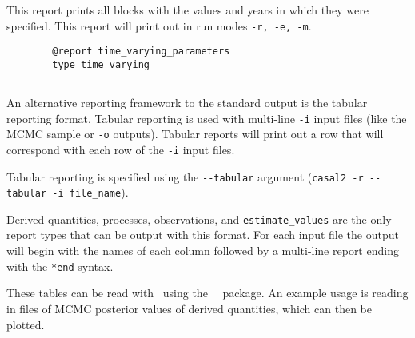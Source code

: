 This report prints all  blocks with the values and years in which they were specified. This report will print out in run modes \texttt{-r, -e, -m}.

{\small{\begin{verbatim}
		@report time_varying_parameters
		type time_varying
		\end{verbatim}}}

\subsection{}\label{sec:Tabular}

An alternative reporting framework to the standard output is the tabular reporting format. Tabular reporting is used with multi-line \texttt{-i} input files (like the MCMC sample or \texttt{-o} outputs). Tabular reports will print out a row that will correspond with each row of the \texttt{-i} input files.

Tabular reporting is specified using the \texttt{-{}-tabular} argument (\texttt{casal2 -r -{}-tabular -i file\_name}).

Derived quantities, processes, observations, and \texttt{estimate\_values} are the only report types that can be output with this format. For each input file the output will begin with the names of each column followed by a multi-line report ending with the \texttt{*end} syntax.

These tables can be read with \R\ using the \CNAME\ \R\ package. An example usage is reading in files of MCMC posterior values of derived quantities, which can then be plotted.


